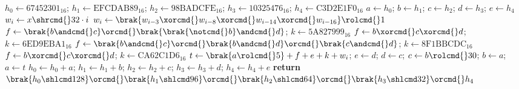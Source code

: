 \begin{algorithmic}[1]
\State $h_0\gets\textrm{67452301}_{16}$; $h_1\gets\textrm{EFCDAB89}_{16}$; $h_2\gets\textrm{98BADCFE}_{16}$; $h_3\gets\textrm{10325476}_{16}$; $h_4\gets\textrm{C3D2E1F0}_{16}$
\State $a\gets h_0$; $b\gets h_1$; $c\gets h_2$; $d\gets h_3$; $e\gets h_4$
\State $w_i\gets x\shrcmd{}32\cdot i$
\EndFor
{}
\State $w_i\gets\brak{w_{i-3}\xorcmd{}w_{i-8}\xorcmd{}w_{i-14}\xorcmd{}w_{i-16}}\rolcmd{}1$
\EndFor
{}
\State $f\gets \brak{b\andcmd{}c}\orcmd{}\brak{\brak{\notcmd{}b}\andcmd{}d}$; $k\gets\textrm{5A827999}_{16}$
\State $f\gets b\xorcmd{}c\xorcmd{}d$; $k\gets\textrm{6ED9EBA1}_{16}$
\State $f\gets \brak{b\andcmd{}c}\orcmd{}\brak{b\andcmd{}d}\orcmd{}\brak{c\andcmd{}d}$; $k\gets\textrm{8F1BBCDC}_{16}$
\Else{}
\State $f\gets b\xorcmd{}c\xorcmd{}d$; $k\gets\textrm{CA62C1D6}_{16}$
\EndIf
\State $t\gets \brak{a\rolcmd{}5}+f+e+k+w_i$; $e\gets d$; $d\gets c$; $c\gets b\rolcmd{}30$; $b\gets a$; $a\gets t$
\EndFor
\State $h_0\gets h_0+a$; $h_1\gets h_1+b$; $h_2\gets h_2+c$; $h_3\gets h_3+d$; $h_4\gets h_4+e$
\EndFor
\State \textbf{return} $\brak{h_0\shlcmd128}\orcmd{}\brak{h_1\shlcmd96}\orcmd{}\brak{h_2\shlcmd64}\orcmd{}\brak{h_3\shlcmd32}\orcmd{}h_4$
\EndFunction
\end{algorithmic}